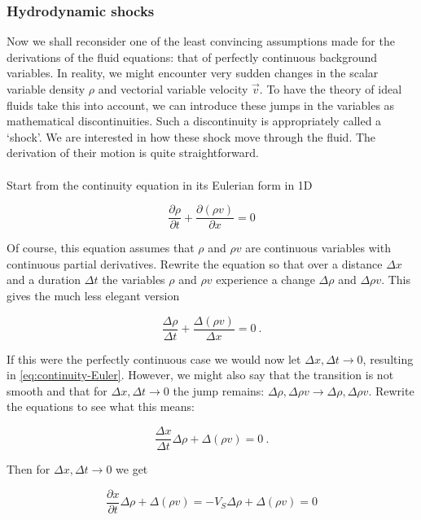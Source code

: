 \subsubsection{Hydrodynamic shocks}

Now we shall reconsider one of the least convincing assumptions made for the derivations of the fluid equations: that of perfectly continuous background variables. In reality, we might encounter very sudden changes in the scalar variable density $\rho$ and vectorial variable velocity $\vec{v}$. To have the theory of ideal fluids take this into account, we can introduce these jumps in the variables as mathematical discontinuities. Such a discontinuity is appropriately called a `shock'. We are interested in how these shock move through the fluid. The derivation of their motion is quite straightforward.\\
\\
Start from the continuity equation in its Eulerian form in 1D

\begin{equation}
\label{eq:continuity-Euler}
\frac{\partial \rho}{\partial t} + \frac{\partial(\rho v)}{\partial x} = 0
\end{equation}

Of course, this equation assumes that $\rho$ and $\rho v$ are continuous variables with continuous partial derivatives. Rewrite the equation so that over a distance $\Delta x$ and a duration $\Delta t$ the variables $\rho$ and $\rho v$ experience a change $\Delta\rho$ and $\Delta \rho v$. This gives the much less elegant version 

$$ \frac{\Delta \rho}{\Delta t} + \frac{\Delta(\rho v)}{\Delta x} = 0 \ . $$

If this were the perfectly continuous case we would now let $\Delta x, \Delta t \to 0$, resulting in \cref{eq:continuity-Euler}. However, we might also say that the transition is not smooth and that for $\Delta x, \Delta t \to 0$ the jump remains: $ \Delta \rho, \Delta \rho v \to \Delta \rho, \Delta \rho v $. Rewrite the equations to see what this means:

$$ \frac{\Delta x}{\Delta t} \Delta \rho + \Delta(\rho v) = 0 \ . $$

Then for $\Delta x, \Delta t \to 0$ we get 

\begin{equation}
\label{eq:HD-shock-condition}
\frac{\partial x}{\partial t} \Delta \rho + \Delta(\rho v) = -V_S \Delta \rho + \Delta(\rho v) = 0
\end{equation}

